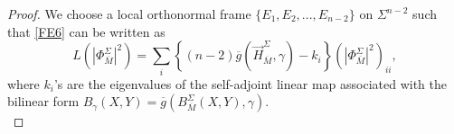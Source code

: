 \documentclass[11pt]{amsart}
\DeclareMathOperator{\Hessian}{Hess}
\numberwithin{equation}{section}
\begin{document}
\begin{proof}
    We choose a local orthonormal frame $\{E_1, E_2, ..., E_{n-2}\}$ on $\Sigma^{n-2}$ such that \eqref{FE6} can be written as
    \begin{equation}\label{FE11}
        L(\left|\Phi^{\Sigma}_{\overline{M}}\right|^2)= \sum_i \left\{(n-2)\overline{g}\left(\vec{H}^{\Sigma}_{\overline{M}}, \gamma \right)-k_i\right\} \left(\left|\Phi^{\Sigma}_{\overline{M}}\right|^2\right)_{ii},
    \end{equation}
    where $k_i$'s are the eigenvalues of the self-adjoint linear map associated with the bilinear form $B_{\gamma}(X, Y)= \overline{g}\left(B^{\Sigma}_{\overline{M}}(X, Y), \gamma\right)$.\\

\end{proof}
\end{document}
